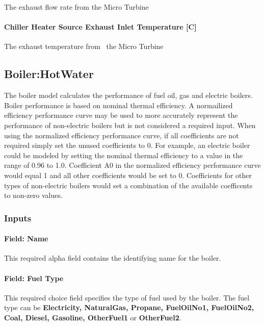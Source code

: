 The exhaust flow rate from the Micro Turbine

\paragraph{Chiller Heater Source Exhaust Inlet Temperature {[}C{]}}\label{chiller-heater-source-exhaust-inlet-temperature-c}

The exhaust temperature from~ the Micro Turbine

\subsection{Boiler:HotWater}\label{boilerhotwater}

The boiler model calculates the performance of fuel oil, gas and electric boilers. Boiler performance is based on nominal thermal efficiency. A normailized efficiency performance curve may be used to more accurately represent the performance of non-electric boilers but is not considered a required input. When using the normalized efficiency performance curve, if all coefficients are not required simply set the unused coefficients to 0. For example, an electric boiler could be modeled by setting the nominal thermal efficiency to a value in the range of 0.96 to 1.0. Coefficient A0 in the normalized efficiency performance curve would equal 1 and all other coefficients would be set to 0. Coefficients for other types of non-electric boilers would set a combination of the available coefficents to non-zero values.

\subsubsection{Inputs}\label{inputs-10-013}

\paragraph{Field: Name}\label{field-name-9-012}

This required alpha field contains the identifying name for the boiler.

\paragraph{Field: Fuel Type}\label{field-fuel-type-3-000}

This required choice field specifies the type of fuel used by the boiler. The fuel type can be \textbf{Electricity, NaturalGas, Propane, FuelOilNo1, FuelOilNo2, Coal, Diesel, Gasoline, OtherFuel1} or \textbf{OtherFuel2}.

